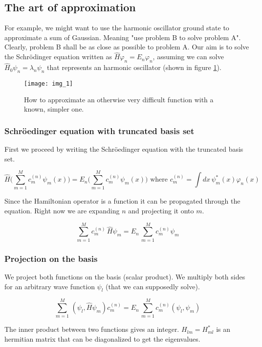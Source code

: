 	\subsection{The art of approximation}
	For example, we might want to use the harmonic oscillator ground state to approximate a sum of Gaussian.
	Meaning "use problem B to solve problem A".
	Clearly, problem B shall be as close as possible to problem A.
	Our aim is to solve the Schr{\"o}dinger equation written as $\hat{H}\varphi_n=E_n\varphi_n$, assuming we can solve $\hat{H}_0\psi_n=\lambda_n\psi_n$ that represents an harmonic oscillator (shown in figure \ref{fig:approximation}).

	\begin{figure}[htbp!]
	\centering
	\texttt{[image: img\_1]}
	\caption{How to approximate an otherwise very difficult function with a known, simpler one.}
	\label{fig:approximation}
	\end{figure}

		\subsubsection{Schr\"oedinger equation with truncated basis set}
		First we proceed by writing the Schr\"oedinger equation with the truncated basis set.

		$$\hat{H}\bigg(\sum_{m=1}^{M}c_m^{(n)}\psi_m(x)\bigg)=E_n\bigg(\sum_{m=1}^{M}c_m^{(n)}\psi_m(x)\bigg)\text{ where }c_m^{(n)}=\int dx\,\psi_m^*(x)\varphi_n(x)$$

		Since the Hamiltonian operator is a function it can be propagated through the equation.
		Right now we are expanding $n$ and projecting it onto $m$.

		$$\sum_{m=1}^{M}c_m^{(n)}\,\hat{H}\psi_m=E_n\,\sum_{m=1}^{M}c_m^{(n)}\psi_m$$

		\subsubsection{Projection on the basis}
		We project both functions on the basis (scalar product).
		We multiply both sides for an arbitrary wave function $\psi_l$ (that we can supposedly solve).

		$$\sum_{m=1}^{M}\,(\psi_l,\hat{H}\psi_m)c_m^{(n)}=E_n\,\sum_{m=1}^{M}c_m^{(n)}(\psi_l,\psi_m)$$

		The inner product between two functions gives an integer.
		$H_{lm}=H_{ml}^*$ is an hermitian matrix that can be diagonalized to get the eigenvalues.

